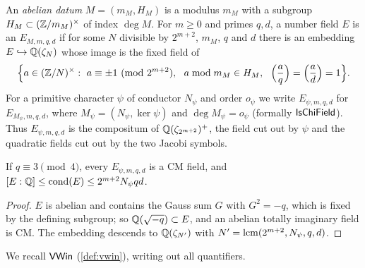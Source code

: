 \begin{definition}\label{def:window:fields}
An \emph{abelian datum} $M=(m_M,H_M)$ is a modulus $m_M$ with a subgroup $H_M\subset(\mathbb{Z}/m_M)^\times$ of index
$\deg M$. For $m\ge0$ and primes $q,d$, a number field $E$ is an \emph{$E_{M,m,q,d}$} if for some $N$ divisible
by $2^{m+2}$, $m_M$, $q$ and $d$ there is an embedding $E\hookrightarrow\mathbb{Q}(\zeta_N)$ whose image is the fixed field of
\[
 \Bigl\{a\in(\Z/N)^\times:\ a\equiv\pm1\ (\mathrm{mod}\ 2^{m+2}),\ \ a\bmod m_M\in H_M,\ \
 \Bigl(\frac aq\Bigr)=\Bigl(\frac ad\Bigr)=1\Bigr\}.
\]
For a primitive character $\psi$ of conductor $N_\psi$ and order $o_\psi$ we write $E_{\psi,m,q,d}$ for
$E_{M_\psi,m,q,d}$, where $M_\psi=(N_\psi,\ker\psi)$ and $\deg M_\psi=o_\psi$ (formally $\mathsf{IsChiField}$).
Thus $E_{\psi,m,q,d}$ is the compositum of $\mathbb{Q}(\zeta_{2^{m+2}})^+$, the field cut out by $\psi$ and the quadratic
fields cut out by the two Jacobi symbols.
\end{definition}

\begin{lemma}\label{lem:window:cm}
If $q\equiv3\pmod4$, every $E_{\psi,m,q,d}$ is a CM field, and $[E:\mathbb{Q}]\le\operatorname{cond}(E)\le2^{m+2}N_\psi qd$.
\end{lemma}

\begin{proof}
$E$ is abelian and contains the Gauss sum $G$ with $G^2=-q$, which is fixed by the defining subgroup; so
$\mathbb{Q}(\sqrt{-q})\subset E$, and an abelian totally imaginary field is CM. The embedding descends to $\mathbb{Q}(\zeta_{N'})$
with $N'=\operatorname{lcm}(2^{m+2},N_\psi,q,d)$.
\end{proof}

We recall $\mathsf{VWin}$ (\cref{def:vwin}), writing out all quantifiers.


